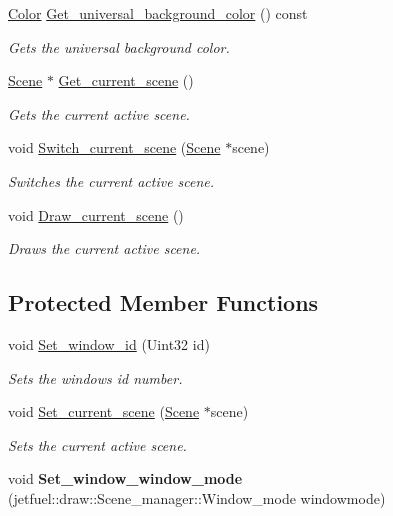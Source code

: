 \begin{DoxyCompactItemize}
\hyperlink{classjetfuel_1_1draw_1_1Color}{Color} \hyperlink{classjetfuel_1_1draw_1_1Scene__manager_a1f8e3144806b276df030ab9db20fa185}{Get\+\_\+universal\+\_\+background\+\_\+color} () const
\begin{DoxyCompactList}\small\item\em Gets the universal background color. \end{DoxyCompactList}\item 
\hyperlink{classjetfuel_1_1draw_1_1Scene}{Scene} $\ast$ \hyperlink{classjetfuel_1_1draw_1_1Scene__manager_aee85c52970c33205355ee0b6086373ba}{Get\+\_\+current\+\_\+scene} ()
\begin{DoxyCompactList}\small\item\em Gets the current active scene. \end{DoxyCompactList}\item 
void \hyperlink{classjetfuel_1_1draw_1_1Scene__manager_a770c163b88ba8427539ee182315ea989}{Switch\+\_\+current\+\_\+scene} (\hyperlink{classjetfuel_1_1draw_1_1Scene}{Scene} $\ast$scene)
\begin{DoxyCompactList}\small\item\em Switches the current active scene. \end{DoxyCompactList}\item 
void \hyperlink{classjetfuel_1_1draw_1_1Scene__manager_a8af9a3abfd5121b1b8556342de435773}{Draw\+\_\+current\+\_\+scene} ()
\begin{DoxyCompactList}\small\item\em Draws the current active scene. \end{DoxyCompactList}\end{DoxyCompactItemize}
\subsection*{Protected Member Functions}
\begin{DoxyCompactItemize}
\item 
void \hyperlink{classjetfuel_1_1draw_1_1Scene__manager_a1205e2dd88e98603c4fad97bb1febf99}{Set\+\_\+window\+\_\+id} (Uint32 id)
\begin{DoxyCompactList}\small\item\em Sets the window\textquotesingle{}s id number. \end{DoxyCompactList}\item 
void \hyperlink{classjetfuel_1_1draw_1_1Scene__manager_a3c2b083844adc254edfba9278222dac8}{Set\+\_\+current\+\_\+scene} (\hyperlink{classjetfuel_1_1draw_1_1Scene}{Scene} $\ast$scene)
\begin{DoxyCompactList}\small\item\em Sets the current active scene. \end{DoxyCompactList}\item 
\mbox{\label{classjetfuel_1_1draw_1_1Scene__manager_a84ab1b6f378d312f537d2d26ef2c15ab}} 
void {\bfseries Set\+\_\+window\+\_\+window\+\_\+mode} (jetfuel\+::draw\+::\+Scene\+\_\+manager\+::\+Window\+\_\+mode windowmode)
\end{DoxyCompactItemize}
